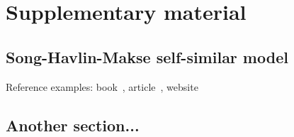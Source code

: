\chapter{Supplementary material}


\section{Song-Havlin-Makse self-similar model}
 
Reference examples: book~\cite{barrat2008dynamical}, article~\cite{de2013mathematical}, website~\cite{weforumProtectingCritical}

\section{Another section...}



\newpage
